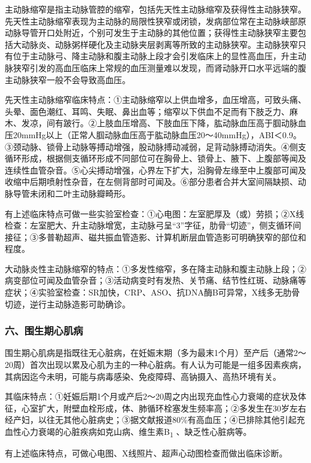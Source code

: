 主动脉缩窄是指主动脉管腔的缩窄，包括先天性主动脉缩窄及获得性主动脉狭窄。先天性主动脉缩窄表现为主动脉的局限性狭窄或闭锁，发病部位常在主动脉峡部原动脉导管开口处附近，个别可发生于主动脉的其他位置；获得性主动脉狭窄主要包括大动脉炎、动脉粥样硬化及主动脉夹层剥离等所致的主动脉狭窄。主动脉狭窄只有位于主动脉弓、降主动脉和腹主动脉上段才会引发临床上的显性高血压，升主动脉狭窄引发的高血压临床上常规的血压测量难以发现，而肾动脉开口水平远端的腹主动脉狭窄一般不会导致高血压。

先天性主动脉缩窄临床特点：①主动脉缩窄以上供血增多，血压增高，可致头痛、头晕、面色潮红、耳鸣、失眠、鼻出血等；缩窄以下供血不足而有下肢乏力、麻木、发凉，间有跛行。②上肢血压增高、下肢血压下降，肱动脉血压高于腘动脉血压20mmHg以上（正常人腘动脉血压高于肱动脉血压20～40mmHg），ABI＜0.9。③颈动脉、锁骨上动脉等搏动增强，股动脉搏动减弱，足背动脉搏动消失。④侧支循环形成，根据侧支循环形成不同部位可在胸骨上、锁骨上、腋下、上腹部等闻及连续性血管杂音。⑤心尖搏动增强，心界左下扩大，沿胸骨左缘至中上腹部可闻及收缩中后期喷射性杂音，在左侧背部时可闻及。⑥部分患者合并大室间隔缺损、动脉导管未闭和二叶主动脉瓣畸形。

有上述临床特点可做一些实验室检查：①心电图：左室肥厚及（或）劳损；②X线检查：左室肥大、升主动脉增宽，主动脉弓呈“3”字征，肋骨“切迹”，侧支循环间接征；③多普勒超声、磁共振血管造影、计算机断层血管造影可明确狭窄的部位和程度。

大动脉炎性主动脉缩窄的特点：①多发性缩窄，多在降主动脉和腹主动脉上段；②病变部位可闻及血管杂音；③活动病变时有发热、关节痛、结节性红斑、动脉痛等症状；④实验室检查：SR加快，CRP、ASO、抗DNA酶B可异常，X线多无肋骨切迹，逆行主动脉造影可助确诊。

\subsubsection{六、围生期心肌病}

围生期心肌病是指既往无心脏病，在妊娠末期（多为最末1个月）至产后（通常2～20周）首次出现以累及心肌为主的一种心脏病。有人认为可能是一组多因素疾病，其病因迄今未明，可能与病毒感染、免疫障碍、高钠摄入、高热环境有关。

其临床特点：①妊娠后期1个月或产后2～20周之内出现充血性心力衰竭的症状及体征，心室扩大，附壁血栓形成，体、肺循环栓塞发生频率高；②多发生在30岁左右经产妇，以往无其他心脏病史；③据文献报道80\%有高血压；④已排除其他引起充血性心力衰竭的心脏疾病如克山病、维生素B\textsubscript{1}
、缺乏性心脏病等。

有上述临床特点，可做心电图、X线照片、超声心动图检查而做出临床诊断。

